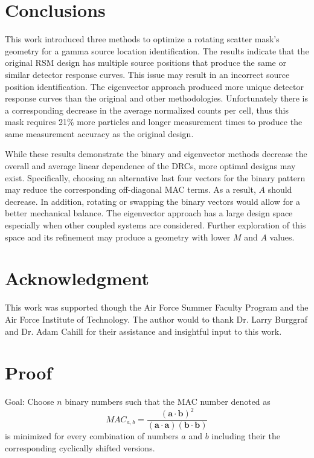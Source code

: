\documentclass[3p,times]{elsarticle}
\begin{document}
\section{Conclusions}
This work introduced three methods to optimize a rotating scatter mask's geometry for a gamma source location identification.  
The results indicate that the original RSM design has multiple source positions that produce the same or similar detector response curves.  
This issue may result in an incorrect source position identification.
The eigenvector approach produced more unique detector response curves than the original and other methodologies. 
Unfortunately there is a corresponding decrease in the average normalized counts per cell, thus this mask requires 21\% more particles and longer measurement times to produce the same measurement
accuracy as the original design.

While these results demonstrate the binary and eigenvector methods decrease the overall and average linear dependence of the DRCs, more optimal designs may exist.  Specifically,
choosing an alternative last four vectors for the binary pattern may reduce the corresponding off-diagonal MAC terms.  As a result, $A$ should decrease.  In addition, rotating or swapping the binary
vectors would allow for a better mechanical balance.  The eigenvector approach has a large
design space especially when other coupled systems are considered.  Further exploration of this space and its refinement may produce a geometry with lower $M$ and $A$ values.

\section{Acknowledgment}
This work was supported though the Air Force Summer Faculty Program and the Air Force Institute of Technology.  The author would to thank Dr. Larry Burggraf and Dr. Adam Cahill for their assistance and insightful input to this work.

\appendix

\section{Proof}

Goal: Choose $n$ binary numbers such that the MAC number denoted as 
\begin{equation}
MAC_{a,b}=\frac{\left(\mathbf{a}\cdot\mathbf{b}\right)^2}{\left(\mathbf{a}\cdot\mathbf{a}\right)\left(\mathbf{b}\cdot\mathbf{b}\right)}
\end{equation}
is minimized for every combination of numbers $a$ and $b$ including their the corresponding cyclically shifted versions.
\end{document}
